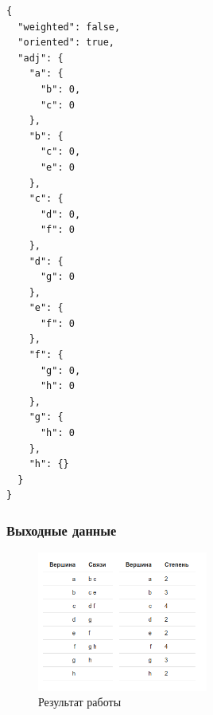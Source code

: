 \begin{verbatim}
{
  "weighted": false,
  "oriented": true,
  "adj": {
    "a": {
      "b": 0,
      "c": 0
    },
    "b": {
      "c": 0,
      "e": 0
    },
    "c": {
      "d": 0,
      "f": 0
    },
    "d": {
      "g": 0
    },
    "e": {
      "f": 0
    },
    "f": {
      "g": 0,
      "h": 0
    },
    "g": {
      "h": 0
    },
    "h": {}
  }
}
\end{verbatim}

\subsubsection{Выходные данные}
\begin{figure}[H]
  \centering\includegraphics[width=0.5\textwidth]{figs/task-2/res-1.png}
  \caption{Результат работы}
\end{figure}